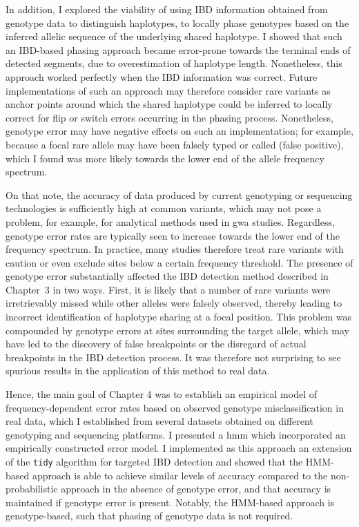 In addition, I explored the viability of using IBD information obtained from genotype data to distinguish haplotypes, \ie to locally phase genotypes based on the inferred allelic sequence of the underlying shared haplotype.
I showed that such an IBD-based phasing approach became error-prone towards the terminal ends of detected segments, due to overestimation of haplotype length.
Nonetheless, this approach worked perfectly when the IBD information was correct.
Future implementations of such an approach may therefore consider rare variants as anchor points around which the shared haplotype could be inferred to locally correct for flip or switch errors occurring in the phasing process.
Nonetheless, genotype error may have negative effects on such an implementation; for example, because a focal rare allele may have been falsely typed or called (false positive), which I found was more likely towards the lower end of the allele frequency spectrum.

On that note, the accuracy of data produced by current genotyping or sequencing technologies is sufficiently high at common variants, which may not pose a problem, for example, for analytical methods used in \gls{gwa} studies.
Regardless, genotype error rates are typically seen to increase towards the lower end of the frequency spectrum.
In practice, many studies therefore treat rare variants with caution or even exclude sites below a certain frequency threshold.
The presence of genotype error substantially affected the IBD detection method described in Chapter~3 in two ways.
First, it is likely that a number of rare variants were irretrievably missed while other alleles were falsely observed, thereby leading to incorrect identification of haplotype sharing at a focal position.
This problem was compounded by genotype errors at sites surrounding the target allele, which may have led to the discovery of false breakpoints or the disregard of actual breakpoints in the IBD detection process.
It was therefore not surprising to see spurious results in the application of this method to real data.

Hence, the main goal of Chapter 4 was to establish an empirical model of frequency-dependent error rates based on observed genotype misclassification in real data, which I established from several datasets obtained on different genotyping and sequencing platforms.
I presented a \gls{hmm} which incorporated an empirically constructed error model.
I implemented as this approach an extension of the \texttt{tidy} algorithm for targeted IBD detection and showed that the HMM-based approach is able to achieve similar levels of accuracy compared to the non-probabilistic approach in the absence of genotype error, and that accuracy is maintained if genotype error is present.
Notably, the HMM-based approach is genotype-based, such that phasing of genotype data is not required.

